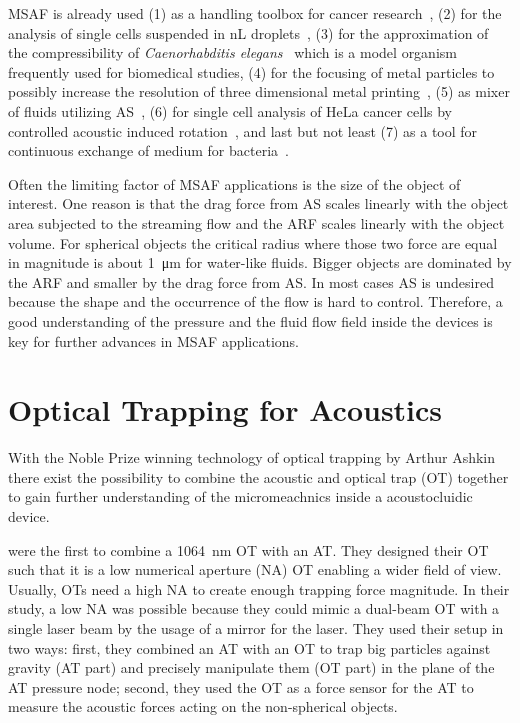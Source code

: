 MSAF is already used (1) as a handling toolbox for cancer 
research~\cite{Antfolk2015,Wu2021,Wang2020,Nguyen2021}, (2) for the analysis of 
single cells suspended in \si{\nano\liter} droplets~\cite{Gerlt2020a}, (3) for 
the approximation of the compressibility of \emph{Caenorhabditis 
elegans}~\cite{Baasch2018} which is a model organism frequently used for 
biomedical studies, (4) for the focusing of metal particles to possibly 
increase the resolution of three dimensional metal printing~\cite{Gerlt2022}, 
(5) as mixer of fluids utilizing 
AS~\cite{Patel2014,Ozcelik2014,Bachman2020,Zhang2021}, (6) for single cell 
analysis of HeLa cancer cells by controlled acoustic induced 
rotation~\cite{Laeubli2021}, and last but not least (7) as a tool for 
continuous exchange of medium for bacteria~\cite{Gerlt2021}.

Often the limiting factor of MSAF applications is the size of the object of 
interest. One reason is that the drag force from AS scales linearly with the 
object area subjected to the streaming flow and the ARF scales linearly with 
the object volume. For spherical objects the critical radius where those two 
force are equal in magnitude is about \SI{1}{\um} for water-like fluids. Bigger 
objects are dominated by the ARF and smaller by the drag force from AS. In most 
cases AS is undesired because the shape and the occurrence of the flow is hard 
to control. Therefore, a good understanding of the pressure and the fluid flow 
field inside the devices is key for further advances in MSAF applications.

\section{Optical Trapping for Acoustics}

With the Noble Prize winning technology of optical trapping by Arthur 
Ashkin~\cite{Ashkin1978,Ashkin1987,Ashkin2002,Ashkin1986,Ashkin1992,Ashkin1997} 
there exist the possibility to combine the acoustic and optical trap (OT) 
together to gain further understanding of the micromeachnics inside a 
acoustocluidic device.

 were the first to combine a \SI{1064}{\nm} OT with an 
AT. They designed their OT such that it is a low numerical aperture (NA) OT 
enabling a wider field of view. Usually, OTs need a high NA to create enough 
trapping force magnitude. In their study, a low NA was possible because they 
could mimic a dual-beam OT with a single laser beam by the usage of a mirror 
for the laser. They used their setup in two ways: first, they combined an AT 
with an OT to trap big particles against gravity (AT part) and precisely 
manipulate them (OT part) in the plane of the AT pressure node; second, they 
used the OT as a force sensor for the AT to measure the acoustic forces acting 
on the non-spherical objects.

